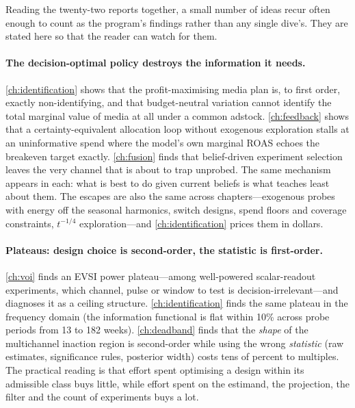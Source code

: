 Reading the twenty-two reports together, a small number of ideas recur often enough to count as the
program's findings rather than any single dive's. They are stated here so that the reader can watch for them.

\paragraph{The decision-optimal policy destroys the information it needs.}
\cref{ch:identification} shows that the profit-maximising media plan is, to first order, exactly
non-identifying, and that budget-neutral variation cannot identify the total marginal value of media at all
under a common adstock. \cref{ch:feedback} shows that a certainty-equivalent allocation loop without
exogenous exploration stalls at an uninformative spend where the model's own marginal ROAS echoes the
breakeven target exactly. \cref{ch:fusion} finds that belief-driven experiment selection leaves the very
channel that is about to trap unprobed. The same mechanism appears in each: what is best to do given current
beliefs is what teaches least about them. The escapes are also the same across chapters---exogenous probes with
energy off the seasonal harmonics, switch designs, spend floors and coverage constraints, $t^{-1/4}$
exploration---and \cref{ch:identification} prices them in dollars.

\paragraph{Plateaus: design choice is second-order, the statistic is first-order.}
\cref{ch:voi} finds an EVSI power plateau---among well-powered scalar-readout experiments, which channel,
pulse or window to test is decision-irrelevant---and diagnoses it as a ceiling structure. \cref{ch:identification}
finds the same plateau in the frequency domain (the information functional is flat within 10\% across
probe periods from 13 to 182 weeks). \cref{ch:deadband} finds that the \emph{shape} of the multichannel
inaction region is second-order while using the wrong \emph{statistic} (raw estimates, significance rules,
posterior width) costs tens of percent to multiples. The practical reading is that effort spent optimising a
design within its admissible class buys little, while effort spent on the estimand, the projection, the filter
and the count of experiments buys a lot.


